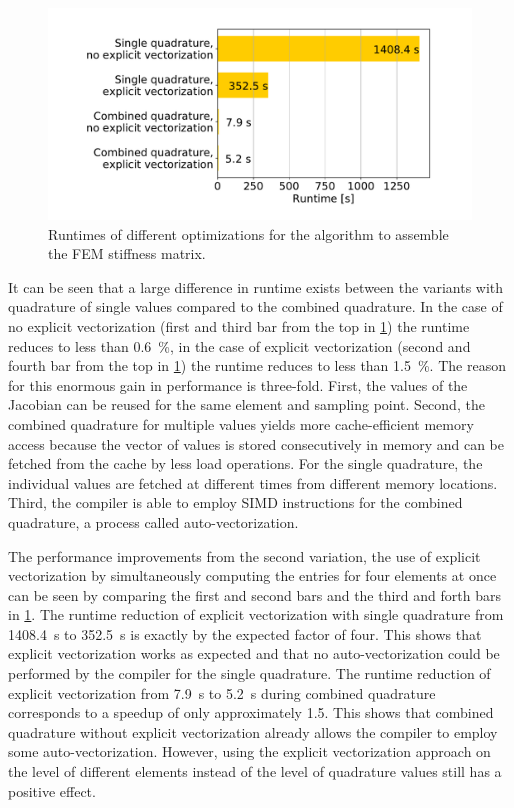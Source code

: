 \begin{figure}%
  \centering%
  \includegraphics[width=\textwidth]{images/implementation/matrix_runtimes.pdf}%
  \caption{Runtimes of different optimizations for the algorithm to assemble the FEM stiffness matrix.}%
  \label{fig:matrix_runtimes}%
\end{figure}%

It can be seen that a large difference in runtime exists between the variants with quadrature of single values compared to the combined quadrature. In the case of no explicit vectorization (first and third bar from the top in \cref{fig:matrix_runtimes}) the runtime reduces to less than \SI{0.6}{\percent}, in the case of explicit vectorization (second and fourth bar from the top in \cref{fig:matrix_runtimes}) the runtime reduces to less than \SI{1.5}{\percent}. The reason for this enormous gain in performance is three-fold. First, the values of the Jacobian can be reused for the same element and sampling point. Second, the combined quadrature for multiple values yields more cache-efficient memory access because the vector of values is stored consecutively in memory and can be fetched from the cache by less load operations. For the single quadrature, the individual values are fetched at different times from different memory locations.
Third, the compiler is able to employ SIMD instructions for the combined quadrature, a process called auto-vectorization.

The performance improvements from the second variation, the use of explicit vectorization by simultaneously computing the entries for four elements at once can be seen by comparing the first and second bars and the third and forth bars in \cref{fig:matrix_runtimes}. The runtime reduction of explicit vectorization with single quadrature from \SI{1408.4}{\second} to \SI{352.5}{\second} is exactly by the expected factor of four. This shows that explicit vectorization works as expected and that no auto-vectorization could be performed by the compiler for the single quadrature. The runtime reduction of explicit vectorization from \SI{7.9}{\second} to \SI{5.2}{\second} during combined quadrature corresponds to a speedup of only approximately \num{1.5}. This shows that combined quadrature without explicit vectorization already allows the compiler to employ some auto-vectorization. However, using the explicit vectorization approach on the level of different elements instead of the level of quadrature values still has a positive effect. 

